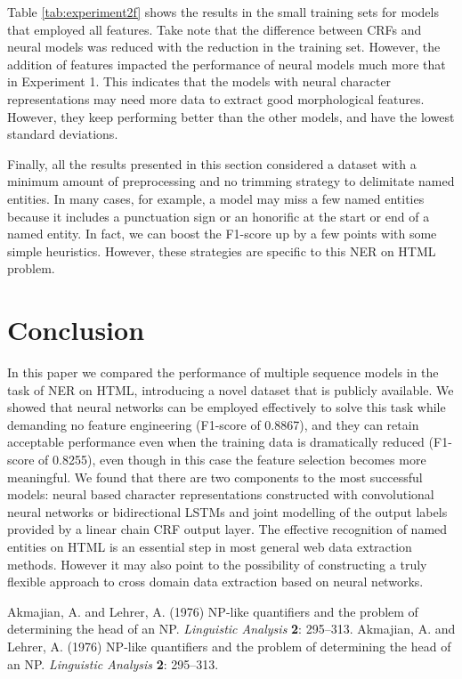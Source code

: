\documentclass{nle}
\begin{document}
Table \ref{tab:experiment2f} shows the results in the small training sets 
for models that employed all features. Take note that the difference between CRFs
and neural models was reduced with the reduction in the training set. However, the
addition of features impacted the performance of neural models much more that in 
Experiment 1. This indicates that the models with neural character representations
may need more data to extract good morphological features. However, they keep performing 
better than the other models, and have the lowest standard deviations.

Finally, all the results presented in this section considered a dataset with a minimum
amount of preprocessing and no trimming strategy to delimitate named entities. In many cases, 
for example, a model may miss a few named entities because it includes a punctuation sign
or an honorific at the start or end of a named entity. In fact, we can boost the F1-score up
by a few points with some simple heuristics. However, these strategies are specific to this
NER on HTML problem.

\section{Conclusion}

In this paper we compared the performance of multiple sequence models in the task of
NER on HTML, introducing a novel dataset that is publicly available. We showed that
neural networks can be employed effectively to solve this task while demanding no 
feature engineering (F1-score of 0.8867), and they can retain acceptable performance 
even when the training data is dramatically reduced (F1-score of 0.8255), even though 
in this case the feature selection becomes more meaningful. We found that there are 
two components to the most successful models: neural based character representations
constructed with convolutional neural networks or bidirectional LSTMs and joint modelling 
of the output labels provided by a linear chain CRF output layer. The effective recognition 
of named entities on HTML is an essential step in most general web data extraction methods. 
However it may also point to the possibility of constructing a truly flexible approach to
cross domain data extraction based on neural networks.

% 
% 

\begin{thebibliography}{}
   Akmajian, A. and Lehrer, A. (1976) NP-like quantifiers and the
   problem of determining the head of an NP. {\it Linguistic
   Analysis\/} {\bf 2}: 295--313.
   Akmajian, A. and Lehrer, A. (1976) NP-like quantifiers and the
   problem of determining the head of an NP. {\it Linguistic
   Analysis\/} {\bf 2}: 295--313.
\end{thebibliography}
\end{document}
